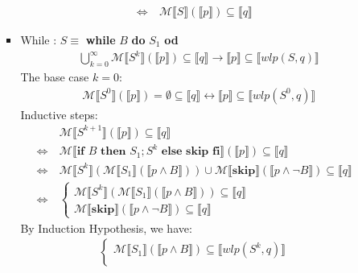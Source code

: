 \documentclass[11pt]{article}
\begin{document}
\begin{enumerate}
\begin{enumerate}
\begin{itemize}
\begin{align*}
						\Leftrightarrow ~& \mathcal{M} \llbracket S \rrbracket(\llbracket p \rrbracket) \subseteq \llbracket q \rrbracket
					\end{align*}
				\item While : $S\equiv$ \textbf{while} $B$ \textbf{do} $S_{1}$ \textbf{od}\\
					\begin{align*}
						& \bigcup_{k=0}^{\infty} \mathcal{M} \llbracket S^{k} \rrbracket(\llbracket p \rrbracket) \subseteq \llbracket q \rrbracket \to \llbracket p \rrbracket \subseteq \llbracket wlp(S, q) \rrbracket
					\end{align*}
					The base case $k=0$:
					\begin{align*}
						& \mathcal{M} \llbracket S^{0} \rrbracket(\llbracket p \rrbracket) = \emptyset \subseteq \llbracket q \rrbracket \leftrightarrow  \llbracket p \rrbracket \subseteq \llbracket wlp(S^{0}, q) \rrbracket
					\end{align*}
					Inductive steps:
					\begin{align*}
						& \mathcal{M} \llbracket S^{k+1} \rrbracket(\llbracket p \rrbracket) \subseteq \llbracket q \rrbracket\\
						\Leftrightarrow ~& \mathcal{M} \llbracket \textbf{if } B \textbf{ then } S_{1};S^{k} \textbf{ else skip fi} \rrbracket(\llbracket p \rrbracket) \subseteq \llbracket q \rrbracket\\
						\Leftrightarrow ~& \mathcal{M} \llbracket S^{k}\rrbracket(\mathcal{M} \llbracket S_{1}\rrbracket(\llbracket p \land B \rrbracket)) \cup \mathcal{M} \llbracket \textbf{skip} \rrbracket (\llbracket p \land \neg B \rrbracket) \subseteq \llbracket q \rrbracket\\
						\Leftrightarrow ~& \begin{cases}
							\mathcal{M} \llbracket S^{k}\rrbracket(\mathcal{M} \llbracket S_{1}\rrbracket(\llbracket p \land B \rrbracket)) \subseteq \llbracket q \rrbracket\\
							\mathcal{M} \llbracket \textbf{skip} \rrbracket (\llbracket p \land \neg B \rrbracket) \subseteq \llbracket q \rrbracket
						\end{cases}
					\end{align*}
					By Induction Hypothesis, we have:
					\begin{align*}
						\begin{cases}
							\mathcal{M}\llbracket S_{1} \rrbracket(\llbracket p \land B \rrbracket) \subseteq \llbracket wlp(S^{k}, q) \rrbracket\\

\end{cases}
\end{align*}
\end{itemize}
\end{enumerate}
\end{enumerate}
\end{document}
